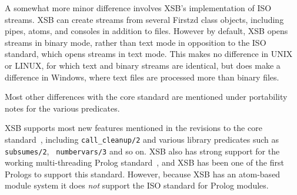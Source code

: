A somewhat more minor difference involves XSB's implementation of ISO
streams.  XSB can create streams from several Firstzd class objects,
including pipes, atoms, and consoles in addition to files.  However by
default, XSB opens streams in binary mode, rather than text mode in
opposition to the ISO standard, which opens streams in text mode.
This makes no difference in UNIX or LINUX, for which text and binary
streams are identical, but does make a difference in Windows, where
text files are processed more than binary files.


Most other differences with the core standard are mentioned under
portability notes for the various predicates.  


XSB supports most new features mentioned in the revisions to the core
standard~\cite{ISO-Revision}, including {\tt call\_cleanup/2} and
various library predicates such as {\tt subsumes/2}, {\tt
  numbervars/3} and so on.  XSB also has strong support for the
working multi-threading Prolog standard~\cite{Prolog-MT-ISO}, and XSB
has been one of the first Prologs to support this standard.  However,
because XSB has an atom-based module system it does {\em not} support
the ISO standard for Prolog modules.

